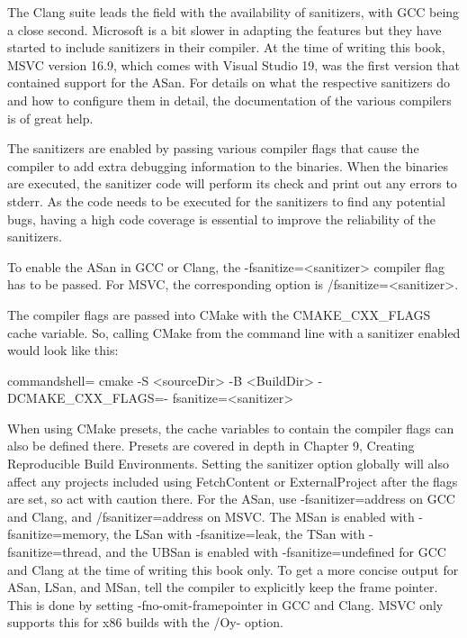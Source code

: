 The Clang suite leads the field with the availability of sanitizers, with GCC being a close second. Microsoft is a bit slower in adapting the features but they have started to include sanitizers in their compiler. At the time of writing this book, MSVC version 16.9, which comes with Visual Studio 19, was the first version that contained support for the ASan. For details on what the respective sanitizers do and how to configure them in detail, the documentation of the various compilers is of great help. 

The sanitizers are enabled by passing various compiler flags that cause the compiler to add extra debugging information to the binaries. When the binaries are executed, the sanitizer code will perform its check and print out any errors to stderr. As the code needs to be executed for the sanitizers to find any potential bugs, having a high code coverage is essential to improve the reliability of the sanitizers.

To enable the ASan in GCC or Clang, the -fsanitize=<sanitizer> compiler flag has to be passed. For MSVC, the corresponding option is /fsanitize=<sanitizer>.

The compiler flags are passed into CMake with the CMAKE\_CXX\_FLAGS cache variable. So, calling CMake from the command line with a sanitizer enabled would look like this:

\begin{tcblisting}{commandshell={}}
cmake -S <sourceDir> -B <BuildDir> -DCMAKE_CXX_FLAGS=-
	fsanitize=<sanitizer>
\end{tcblisting}

When using CMake presets, the cache variables to contain the compiler flags can also be defined there. Presets are covered in depth in Chapter 9, Creating Reproducible Build Environments. Setting the sanitizer option globally will also affect any projects included using FetchContent or ExternalProject after the flags are set, so act with caution there. For the ASan, use -fsanitizer=address on GCC and Clang, and /fsanitizer=address on MSVC. The MSan is enabled with -fsanitize=memory, the LSan with -fsanitize=leak, the TSan with -fsanitize=thread, and the UBSan is enabled with -fsanitize=undefined for GCC and Clang at the time of writing this book only. To get a more concise output for ASan, LSan, and MSan, tell the compiler to explicitly keep the frame pointer. This is done by setting -fno-omit-framepointer in GCC and Clang. MSVC only supports this for x86 builds with the /Oy- option.

